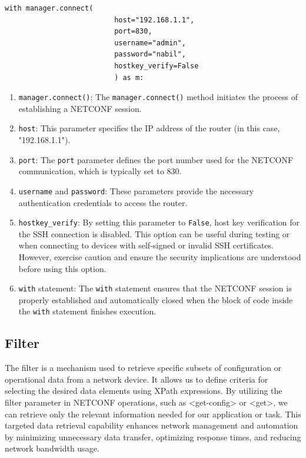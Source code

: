 \begin{lstlisting}[style=pythonStyle, caption={Session establishment.}, backgroundcolor=\color{codebackground}]
                    with manager.connect(
                          host="192.168.1.1",
                          port=830,
                          username="admin", 
                          password="nabil",
                          hostkey_verify=False
                          ) as m:           
\end{lstlisting}


\begin{enumerate}
    \item \texttt{manager.connect()}: The \texttt{manager.connect()} method initiates the process of establishing a NETCONF session.
    \item \texttt{host}: This parameter specifies the IP address of the router (in this case, "192.168.1.1").
    \item \texttt{port}: The \texttt{port} parameter defines the port number used for the NETCONF communication, which is typically set to 830.
    \item \texttt{username} and \texttt{password}: These parameters provide the necessary authentication credentials to access the router.
    \item \texttt{hostkey\_verify}: By setting this parameter to \texttt{False}, host key verification for the SSH connection is disabled. This option can be useful during testing or when connecting to devices with self-signed or invalid SSH certificates. However, exercise caution and ensure the security implications are understood before using this option.
    \item \texttt{with} statement: The \texttt{with} statement ensures that the NETCONF session is properly established and automatically closed when the block of code inside the \texttt{with} statement finishes execution.
\end{enumerate}
\subsection{Filter}
The filter is a mechanism used to retrieve specific subsets of configuration or operational data from a network device. It allows us to define criteria for selecting the desired data elements using XPath expressions. By utilizing the filter parameter in NETCONF operations, such as <get-config> or <get>, we can retrieve only the relevant information needed for our application or task. This targeted data retrieval capability enhances network management and automation by minimizing unnecessary data transfer, optimizing response times, and reducing network bandwidth usage. 


